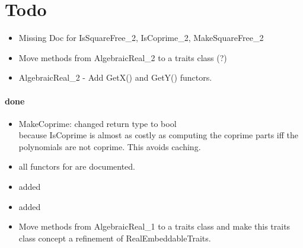 \section{Todo}
\begin{itemize}
\item Missing Doc for IsSquareFree\_2, IsCoprime\_2, MakeSquareFree\_2
\item Move methods from AlgebraicReal\_2 to a traits class (?)
\item AlgebraicReal\_2 - Add GetX() and GetY() functors.
\end{itemize}

\paragraph{done} 
\begin{itemize}
\item MakeCoprime: changed return type to bool\\
      because IsCoprime is almost as costly as computing the coprime
      parts iff the polynomials are not coprime. This avoids caching.  
\item all functors for  
      are documented.
\item added 
\item added  
\item Move methods from AlgebraicReal\_1 to a traits class and make
  this traits class concept a refinement of RealEmbeddableTraits.
\end{itemize}


